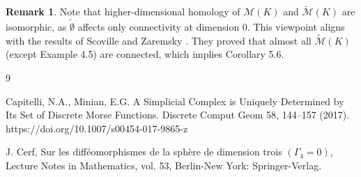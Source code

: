 \documentclass[a4paper,12pt,notitlepage]{amsart}
\theoremstyle{definition}%
\newtheorem{remark}[theorem]{Remark}
\theoremstyle{definition}%
\theoremstyle{definition}%
\newcommand{\M}{\mathcal{M}}
\newcommand{\es}{\tilde{\emptyset}}
\newcommand{\MMK}{\widetilde{\mathcal{M}} (K)}
\begin{document}
\begin{remark}
Note that higher-dimensional homology of $\M(K)$ and $\MMK$
are isomorphic,
as $\es$ affects only connectivity at dimension $0$.
This viewpoint aligns with the results of Scoville and Zaremsky \cite[Theorem 5.4]{higher connectivity of the morse complex}.
They
proved that almost all $\MMK$ (except Example 4.5) are connected,
which implies Corollary 5.6.





\end{remark}

\newpage
\begin{thebibliography}{9}


















Capitelli, N.A., Minian, E.G. A Simplicial Complex is Uniquely Determined by Its Set of Discrete Morse Functions. Discrete Comput Geom 58, 144–157 (2017). https://doi.org/10.1007/s00454-017-9865-z

J. Cerf,
Sur les difféomorphismes de la sphère de dimension trois $(\Gamma_4=0)$,
Lecture Notes in Mathematics, vol. 53, Berlin-New York: Springer-Verlag.


\end{thebibliography}
\end{document}
